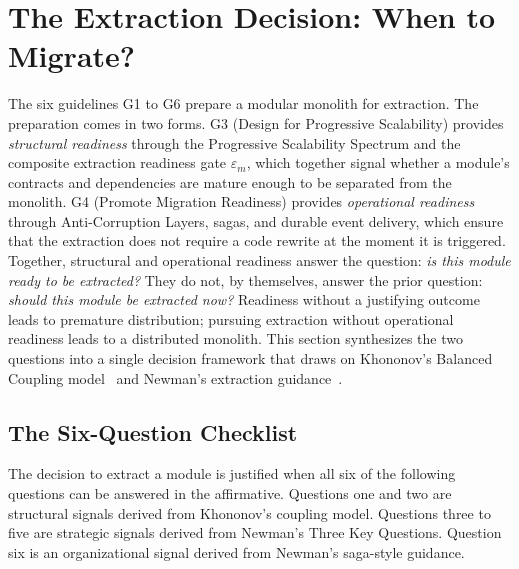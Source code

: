 \pagebreak
\section{The Extraction Decision: When to Migrate?}
\label{sec:extraction-decision}

The six guidelines G1 to G6 prepare a modular monolith for extraction. The preparation comes in two forms. G3 (Design for Progressive Scalability) provides \emph{structural readiness} through the Progressive Scalability Spectrum and the composite extraction readiness gate $\varepsilon_m$, which together signal whether a module's contracts and dependencies are mature enough to be separated from the monolith. G4 (Promote Migration Readiness) provides \emph{operational readiness} through Anti-Corruption Layers, sagas, and durable event delivery, which ensure that the extraction does not require a code rewrite at the moment it is triggered. Together, structural and operational readiness answer the question: \emph{is this module ready to be extracted?} They do not, by themselves, answer the prior question: \emph{should this module be extracted now?} Readiness without a justifying outcome leads to premature distribution; pursuing extraction without operational readiness leads to a distributed monolith. This section synthesizes the two questions into a single decision framework that draws on Khononov's Balanced Coupling model~\cite{khononov2024balancing} and Newman's extraction guidance~\cite{newman2019monolith}.

\subsection*{The Six-Question Checklist}

The decision to extract a module is justified when all six of the following questions can be answered in the affirmative. Questions one and two are structural signals derived from Khononov's coupling model. Questions three to five are strategic signals derived from Newman's Three Key Questions. Question six is an organizational signal derived from Newman's saga-style guidance.

